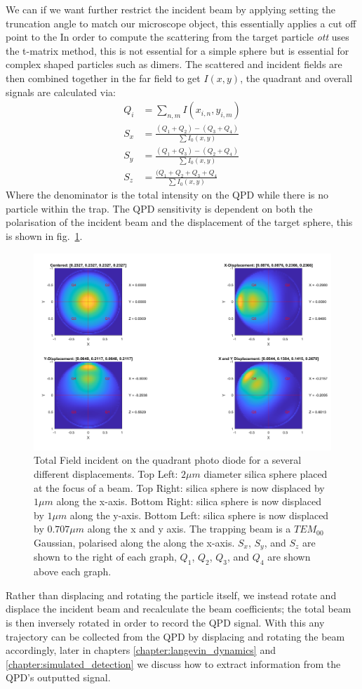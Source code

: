 We can if we want further restrict the incident beam by applying setting the truncation angle to match our microscope object, this essentially applies a cut off point to the In order to compute the scattering from the target particle \textit{ott} uses the t-matrix method, this is not essential for a simple sphere but is essential for complex shaped particles such as dimers. The scattered and incident fields are then combined together in the far field to get $I(x,y)$, the quadrant and overall signals are calculated via:
\begin{align}
	Q_i &= \sum_{n,m} I(x_{i,n}, y_{i,m}) \\
	S_{x} &= \frac{(Q_1+Q_2)-(Q_3+Q_4)}{\sum I_0(x,y)} \\
	S_{y} &= \frac{(Q_1+Q_3)-(Q_2+Q_4)}{\sum I_0(x,y)} \\
	S_{z} &= \frac{(Q_1+Q_2+Q_3+Q_4}{\sum I_0(x,y)}
\end{align}
Where the denominator is the total intensity on the QPD while there is no particle within the trap. The QPD sensitivity is dependent on both the polarisation of the incident beam and the displacement of the target sphere, this is shown in fig.~\ref{fig:totalfield}.
\begin{figure}[h]
	\centering
	\includegraphics[width=0.85\linewidth]{fixed_polarisation.png}
	\captionsetup{margin=0.5cm}
	\caption{Total Field incident on the quadrant photo diode for a several different displacements. Top Left: $2\mu m $ diameter silica sphere placed at the focus of a  beam. Top Right: silica sphere is now displaced by $1 \mu m$ along the x-axis. Bottom Right: silica sphere is now displaced by $1 \mu m$ along the y-axis. Bottom Left: silica sphere is now displaced by $0.707 \mu m$ along the x and y axis. The trapping beam is a $TEM_00$ Gaussian, polarised along the along the x-axis. $S_x$, $S_y$, and $S_z$ are shown to the right of each graph, $Q_1$, $Q_2$, $Q_3$, and $Q_4$ are shown above each graph.}
	\label{fig:totalfield}
\end{figure}

Rather than displacing and rotating the particle itself, we instead rotate and displace the incident beam and recalculate the beam coefficients; the total beam is then inversely rotated in order to record the QPD signal. With this any trajectory can be collected from the QPD by displacing and rotating the beam accordingly, later in chapters \ref{chapter:langevin_dynamics} and \ref{chapter:simulated_detection} we discuss how to extract information from the QPD's outputted signal.
